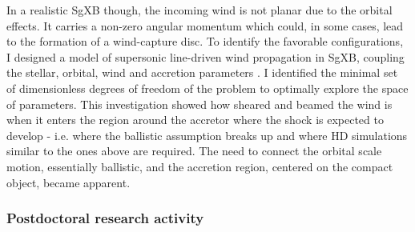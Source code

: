 \documentclass[a4paper,12pt,onecolumn]{article}
\begin{document}
\indent In a realistic SgXB though, the incoming wind is not planar due to the orbital effects. It carries a non-zero angular momentum which could, in some cases, lead to the formation of a wind-capture disc. To identify the favorable configurations, I designed a model of supersonic line-driven wind propagation in SgXB, coupling the stellar, orbital, wind and accretion parameters \citep{ElMellah2016a}. I identified the minimal set of dimensionless degrees of freedom of the problem to optimally explore the space of parameters. This investigation showed how sheared and beamed the wind is when it enters the region around the accretor where the shock is expected to develop - i.e. where the ballistic assumption breaks up and where HD simulations similar to the ones above are required. The need to connect the orbital scale motion, essentially ballistic, and the accretion region, centered on the compact object, became apparent.\\

\subsubsection*{Postdoctoral research activity}
\end{document}
